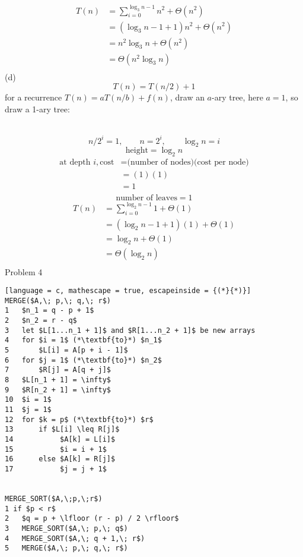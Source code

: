 \documentclass[12pt,border=4pt,multi]{article}%
\begin{document}
\begin{align*}
    T(n) &= \sum_{i = 0}^{\log_3 n - 1} n^2 + \Theta(n^2)\\
    &= (\log_3 n - 1 + 1) n^2 + \Theta(n^2)\\
    &= n^2\log_3 n + \Theta(n^2)\\
    &= \Theta(n^2\log_3 n)\\
\end{align*}
\newpage
\noindent
(d)
\[T(n) = T(n / 2) + 1\]
for a recurrence $T(n) = aT(n / b) + f(n)$, draw an $a$-ary tree, here $a = 1$, so draw a 1-ary tree:\\
\begin{center}
\end{center}
\\
\[n / 2^i = 1, \qquad n = 2^i, \qquad \log_2 n = i\]
\[\text{height} = \log_2 n\]
\begin{align*}
     \text{at depth } i , \text{cost} &= \text{(number of nodes)(cost per node)}\\
     &= (1)(1)\\
     &= 1\\
\end{align*}
\[\text{number of leaves} = 1\]
\begin{align*}
    T(n) &= \sum_{i = 0}^{\log_2 n - 1} 1 + \Theta(1)\\
    &= (\log_2 n - 1 + 1)(1) + \Theta(1)\\
    &= \log_2 n + \Theta(1)\\
    &= \Theta(\log_2 n)\\
\end{align*}
\newpage
\noindent
Problem 4
\begin{lstlisting}[language = c, mathescape = true, escapeinside = {(*}{*)}]
MERGE($A,\; p,\; q,\; r$)
1   $n_1 = q - p + 1$
2   $n_2 = r - q$
3   let $L[1...n_1 + 1]$ and $R[1...n_2 + 1]$ be new arrays
4   for $i = 1$ (*\textbf{to}*) $n_1$
5       $L[i] = A[p + i - 1]$
6   for $j = 1$ (*\textbf{to}*) $n_2$
7       $R[j] = A[q + j]$
8   $L[n_1 + 1] = \infty$
9   $R[n_2 + 1] = \infty$
10  $i = 1$
11  $j = 1$
12  for $k = p$ (*\textbf{to}*) $r$
13      if $L[i] \leq R[j]$
14           $A[k] = L[i]$
15           $i = i + 1$
16      else $A[k] = R[j]$
17           $j = j + 1$


MERGE_SORT($A,\;p,\;r$)
1 if $p < r$
2   $q = p + \lfloor (r - p) / 2 \rfloor$
3   MERGE_SORT($A,\; p,\; q$)
4   MERGE_SORT($A,\; q + 1,\; r$)
5   MERGE($A,\; p,\; q,\; r$)
\end{lstlisting}
\end{document}
